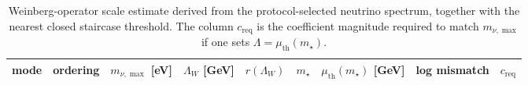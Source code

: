 %

\begin{table}[t]
\centering
\scriptsize
\setlength{\tabcolsep}{5pt}
\renewcommand{\arraystretch}{1.15}
\begin{tabular}{lllrrrrrr}
\toprule
mode & ordering & $m_{\nu,\max}$ [eV] & $\Lambda_W$ [GeV] & $r(\Lambda_W)$ & $m_\star$ & $\mu_{\mathrm{th}}(m_\star)$ [GeV] & log mismatch & $c_{\mathrm{req}}$ \\
\midrule
%
\end{tabular}
\caption{Weinberg-operator scale estimate derived from the protocol-selected neutrino spectrum, together with the nearest closed staircase threshold. The column $c_{\mathrm{req}}$ is the coefficient magnitude required to match $m_{\nu,\max}$ if one sets $\Lambda=\mu_{\mathrm{th}}(m_\star)$.}
\label{tab:neutrino_weinberg_scale}
\end{table}

